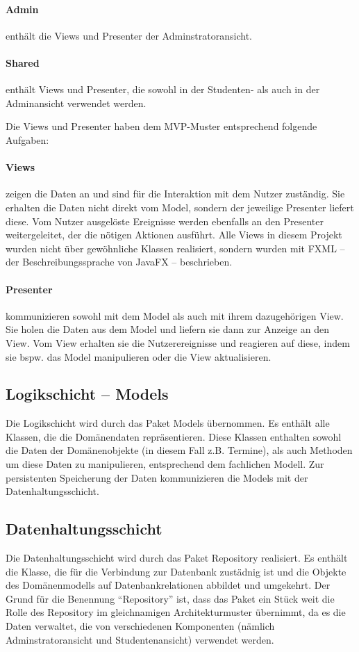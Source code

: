 \paragraph{Admin} enthält die Views und Presenter der Adminstratoransicht.
\paragraph{Shared} enthält Views und Presenter, die sowohl in der Studenten- als auch in der Adminansicht verwendet werden.

Die Views und Presenter haben dem MVP-Muster entsprechend folgende Aufgaben:
\paragraph{Views} zeigen die Daten an und sind für die Interaktion mit dem Nutzer zuständig. Sie erhalten die Daten nicht direkt vom Model, sondern der jeweilige Presenter liefert diese. Vom Nutzer ausgelöste Ereignisse werden ebenfalls an den Presenter weitergeleitet, der die nötigen Aktionen ausführt. Alle Views in diesem Projekt wurden nicht über gewöhnliche Klassen realisiert, sondern wurden mit FXML – der Beschreibungssprache von JavaFX – beschrieben.
\paragraph{Presenter} kommunizieren sowohl mit dem Model als auch mit ihrem dazugehörigen View. Sie holen die Daten aus dem Model und liefern sie dann zur Anzeige an den View. Vom View erhalten sie die Nutzerereignisse und reagieren auf diese, indem sie bspw. das Model manipulieren oder die View aktualisieren.

\subsection{Logikschicht – Models}
Die Logikschicht wird durch das Paket Models übernommen. Es enthält alle Klassen, die die Domänendaten repräsentieren. Diese Klassen enthalten sowohl die Daten der Domänenobjekte (in diesem Fall z.B. Termine), als auch Methoden um diese Daten zu manipulieren, entsprechend dem fachlichen Modell. Zur persistenten Speicherung der Daten kommunizieren die Models mit der Datenhaltungsschicht.

\subsection{Datenhaltungsschicht}
Die Datenhaltungsschicht wird durch das Paket Repository realisiert. Es enthält die Klasse, die für die Verbindung zur Datenbank zustädnig ist und die Objekte des Domänenmodells auf Datenbankrelationen abbildet und umgekehrt. Der Grund für die Benennung "`Repository"' ist, dass das Paket ein Stück weit die Rolle des Repository im gleichnamigen Architekturmuster übernimmt, da es die Daten verwaltet, die von verschiedenen Komponenten (nämlich Adminstratoransicht und Studentenansicht) verwendet werden.

